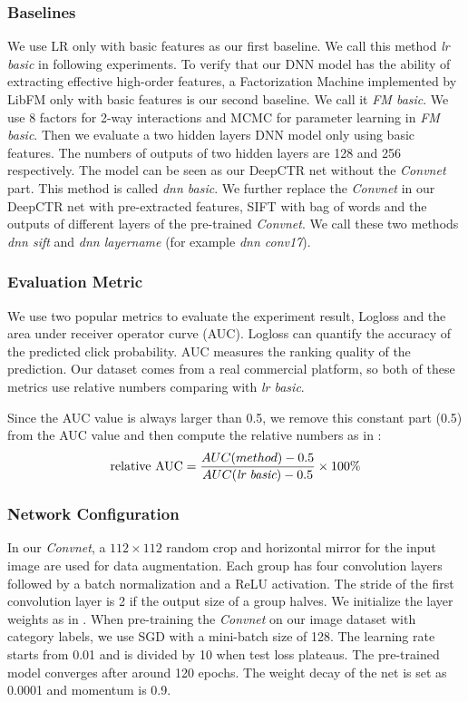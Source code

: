 \documentclass{sig-alternate}
\begin{document}
\subsubsection{Baselines}
We use LR only with basic features as our first baseline. We call this method \emph{lr basic} in following experiments. To verify that our DNN model has the ability of extracting effective high-order features,  a Factorization Machine implemented by LibFM \cite{rendle2012factorization}  only with basic features is our second baseline.  We call it \emph{FM basic}. We use 8 factors for 2-way interactions and MCMC for parameter learning in \emph{FM basic}. Then we  evaluate a two hidden layers DNN model only using basic features. The numbers of outputs of two hidden layers  are 128 and 256 respectively. The model can be seen as our DeepCTR net without the \emph{Convnet} part. This method is called \emph{dnn basic}. We further replace the \emph{Convnet} in our DeepCTR net with pre-extracted features, SIFT \cite{lowe1999object} with bag of words and the outputs of different layers of the pre-trained  \emph{Convnet}. We call these two methods \emph{dnn sift} and \emph{dnn layername} (for example \emph{dnn conv17}). 
\subsubsection{Evaluation Metric}
We use two popular metrics to evaluate the experiment result, Logloss and the area under receiver operator curve (AUC).  Logloss can quantify the accuracy of the predicted click probability. AUC measures the ranking quality of the prediction. Our dataset comes from a real commercial platform, so both of these metrics use relative numbers comparing with \emph{lr basic}. 

Since the AUC value is always larger than 0.5, we remove this constant part (0.5) from the AUC value and then compute the relative numbers as in \cite{yan2014coupled}:
\begin{equation}
\text{relative AUC} = \frac{AUC(method) - 0.5}{AUC(\emph{lr basic})-0.5} \times 100\% 
\end{equation}  
\subsubsection{Network Configuration}
In our \emph{Convnet},  a $112 \times 112$ random crop  and horizontal mirror for the input image are used for data augmentation. Each group has four convolution layers followed by a batch normalization \cite{ioffe2015batch} and a ReLU \cite{nair2010rectified} activation. The stride of the first convolution layer is 2 if the output size of a group halves.  We initialize the layer weights as in  \cite{he2015delving}. When pre-training the \emph{Convnet} on our image dataset with category labels,  we use SGD with a mini-batch size of 128. The learning rate starts from 0.01 and is divided by 10 when test loss plateaus. The pre-trained model converges after around 120 epochs. The weight decay of the net is set as 0.0001 and momentum is 0.9. 
\end{document}

